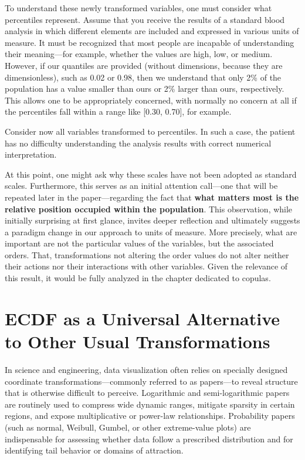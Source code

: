 To understand these newly transformed variables, one must consider what percentiles represent. Assume that you receive the results of a standard blood analysis in which different elements are included and expressed in various units of measure. It must be recognized that most people are incapable of understanding their meaning---for example, whether the values are high, low, or medium. However, if our quantiles are provided (without dimensions, because they are dimensionless), such as 0.02 or 0.98, then we understand that only 2\% of the population has a value smaller than ours or 2\% larger than ours, respectively. This allows one to be appropriately concerned, with normally no concern at all if the percentiles fall within a range like [0.30, 0.70], for example.

Consider now all variables transformed to percentiles. In such a case, the patient has no difficulty understanding the analysis results with correct numerical interpretation.

At this point, one might ask why these scales have not been adopted as standard scales. Furthermore, this serves as an initial attention call---one that will be repeated later in the paper---regarding the fact that \textbf{what matters most is the relative position occupied within the population}. This observation, while initially surprising at first glance, invites deeper reflection and ultimately suggests a paradigm change in our approach to units of measure. More precisely, what are important are not the particular values of the variables, but the associated orders. That, transformations not altering the order values do not alter neither their actions nor their interactions with other variables. Given the relevance of this result, it would be fully analyzed in the chapter dedicated to copulas.

\section{ECDF as a Universal Alternative to Other Usual Transformations}

In science and engineering, data visualization often relies on specially designed coordinate transformations—commonly referred to as papers—to reveal structure that is otherwise difficult to perceive. Logarithmic and semi-logarithmic papers are routinely used to compress wide dynamic ranges, mitigate sparsity in certain regions, and expose multiplicative or power-law relationships. Probability papers (such as normal, Weibull, Gumbel, or other extreme-value plots) are indispensable for assessing whether data follow a prescribed distribution and for identifying tail behavior or domains of attraction.

